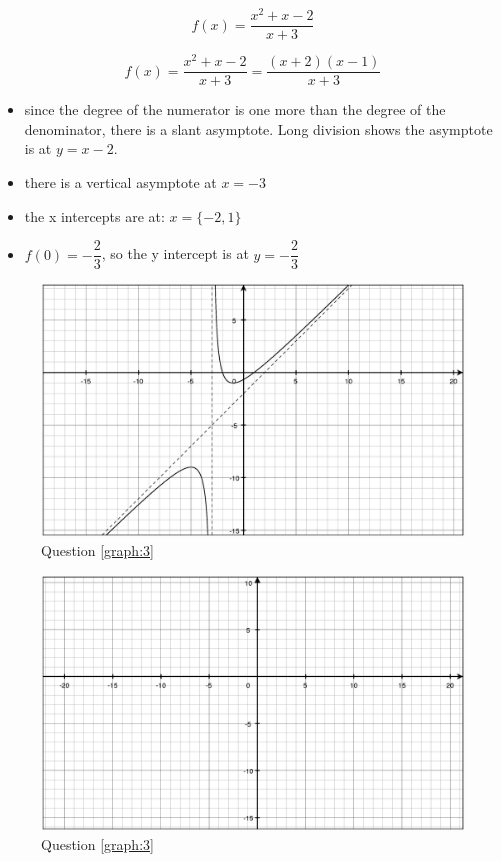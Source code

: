 \documentclass[fleqn,addpoints]{exam}
\begin{document}
\begin{questions}
\ifprintanswers
\else
\pagebreak
\fi

\question[15]
\label{graph:3}

\[
  f(x) = \frac{x^2+x-2}{x+3} 
\]

\begin{solution}[6 cm]

\[
  f(x) = \frac{x^2+x-2}{x+3} = \frac{(x+2)(x-1)}{x+3}
\]

\begin{itemize}
  \item since the degree of the numerator is one more than the degree of the denominator, there is a slant asymptote.
    Long division shows the asymptote is at $y = x-2$.

  \item there is a vertical asymptote at $x=-3$
  \item the x intercepts are at: $x = \{ -2, 1 \}$ 
  \item $f(0) = -\dfrac{2}{3}$, so the y intercept is at $y = -\dfrac{2}{3}$
\end{itemize}

\end{solution}

\ifprintanswers
\begin{figure}[H]
  \centering
  \includegraphics[scale=0.4]{graph_3_solution.eps}
  \caption*{Question \ref{graph:3}}
\end{figure}
\else
\begin{figure}[H]
  \centering
  \includegraphics[scale=0.6]{graph_3_blank.eps}
  \caption*{Question \ref{graph:3}}
\end{figure}
\fi


\end{questions}
\end{document}
